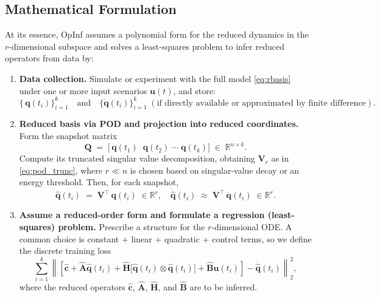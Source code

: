 \subsection*{Mathematical Formulation}
At its essence, OpInf assumes a polynomial form for the reduced dynamics in the $r$-dimensional subspace and solves a least-squares problem to infer reduced operators from data by:

\begin{enumerate}[label=\arabic*)]
    \item \textbf{Data collection.} Simulate or experiment with the full model \eqref{eq:rbasis} under one or more input scenarios $\mathbf{u}(t)$, and store:\\
    \[
        \bigl\{\,\mathbf{q}(t_i)\bigr\}_{i=1}^k 
        \quad\text{and}\quad
        \bigl\{\dot{\mathbf{q}}(t_i)\bigr\}_{i=1}^k \;(\text{if directly available or approximated by finite difference}).
    \]

    \item \textbf{Reduced basis via POD and projection into reduced coordinates.} Form the snapshot matrix
    \[
        \mathbf{Q} \;=\; \bigl[\,\mathbf{q}(t_1)\;\;\mathbf{q}(t_2)\;\cdots\;\mathbf{q}(t_k)\bigr] \;\in\; \mathbb{R}^{n\times k}.
    \]
    Compute its truncated singular value decomposition, obtaining $\mathbf{V}_r$ as in \eqref{eq:pod_trunc}, 
    where $r\ll n$ is chosen based on singular-value decay or an energy threshold. Then, for each snapshot,\\
    \[
        \hat{\mathbf{q}}(t_i) \;=\; \mathbf{V}^{\top}\,\mathbf{q}(t_i)\;\in\mathbb{R}^r,\quad
        \dot{\hat{\mathbf{q}}}(t_i)\;\approx\;\mathbf{V}^{\top}\,\dot{\mathbf{q}}(t_i)\;\in\mathbb{R}^r.
    \]

    \item \textbf{Assume a reduced-order form and formulate a regression (least-squares) problem.} Prescribe a structure for the $r$-dimensional ODE. A common choice is constant + linear + quadratic + control terms, so we define the discrete training loss\\
\begin{equation}
    \sum_{i=1}^{k} \left\| \left[ \hat{\mathbf{c}} + \hat{\mathbf{A}}\hat{\mathbf{q}}(t_i) + \hat{\mathbf{H}}\bigl[ \hat{\mathbf{q}}(t_i) \otimes \hat{\mathbf{q}}(t_i) \bigr] + \hat{\mathbf{B}}\mathbf{u}(t_i) \right] - \dot{\hat{\mathbf{q}}}(t_i) \right\|_2^2,
    \label{loss_opinf}
\end{equation}
where the reduced operators $\hat{\mathbf{c}}$, $\hat{\mathbf{A}}$, $\hat{\mathbf{H}}$, and $\hat{\mathbf{B}}$ are to be inferred.


\end{enumerate}
